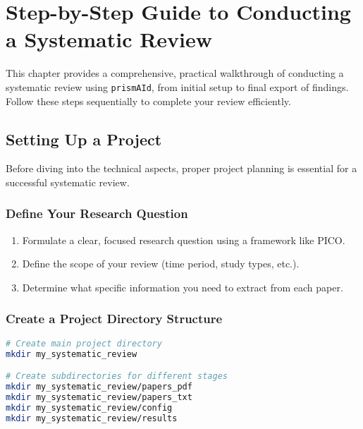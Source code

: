 \chapter[Step-by-Step to a Systematic Review]{Step-by-Step Guide to Conducting a Systematic Review} \label{chap:walkthrough}

This chapter provides a comprehensive, practical walkthrough of conducting a systematic review using \texttt{prismAId}, from initial setup to final export of findings. Follow these steps sequentially to complete your review efficiently.

\section{Setting Up a Project}

Before diving into the technical aspects, proper project planning is essential for a successful systematic review.

\subsection{Define Your Research Question}

\begin{enumerate}
    \item Formulate a clear, focused research question using a framework like PICO.
    \item Define the scope of your review (time period, study types, etc.).
    \item Determine what specific information you need to extract from each paper.
\end{enumerate}


\subsection{Create a Project Directory Structure}

\begin{commandbox}
\begin{lstlisting}[language=Bash]
# Create main project directory
mkdir my_systematic_review

# Create subdirectories for different stages
mkdir my_systematic_review/papers_pdf
mkdir my_systematic_review/papers_txt
mkdir my_systematic_review/config
mkdir my_systematic_review/results
\end{lstlisting}
\end{commandbox}

